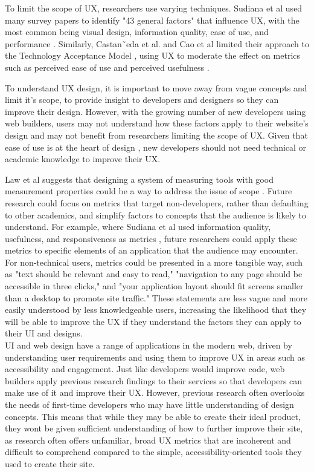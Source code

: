 \documentclass[article]{IEEEtran}
\begin{document}
            To limit the scope of UX, researchers use varying techniques. Sudiana et al used many survey papers to identify "43 general factors" that influence UX, with the most common being visual design, information quality, ease of use, and performance \cite{sudiana}. Similarly, Castan˜eda et al. and Cao et al limited their approach to the Technology Acceptance Model \cite{TAS}, using UX to moderate the effect on metrics such as perceived ease of use and perceived usefulness \cite{castan, cao}.
            
            To understand UX design, it is important to move away from vague concepts and limit it's scope, to provide insight to developers and designers so they can improve their design. However, with the growing number of new developers using web builders, users may not understand how these factors apply to their website's design and may not benefit from researchers limiting the scope of UX. Given that ease of use is at the heart of design \cite{sudiana}, new developers should not need technical or academic knowledge to improve their UX.
                        
            Law et al suggests that designing a system of measuring tools with good measurement properties could be a way to address the issue of scope \cite{schaik}. Future research could focus on metrics that target non-developers, rather than defaulting to other academics, and simplify factors to concepts that the audience is likely to understand. For example, where Sudiana et al used information quality, usefulness, and responsiveness as metrics \cite{sudiana}, future researchers could apply these metrics to specific elements of an application that the audience may encounter. For non-technical users, metrics could be presented in a more tangible way, such as "text should be relevant and easy to read," "navigation to any page should be accessible in three clicks," and "your application layout should fit screens smaller than a desktop to promote site traffic." These statements are less vague and more easily understood by less knowledgeable users, increasing the likelihood that they will be able to improve the UX if they understand the factors they can apply to their UI and designs. \\
        
        UI and web design have a range of applications in the modern web, driven by understanding user requirements and using them to improve UX in areas such as accessibility and engagement. Just like developers would improve code, web builders apply previous research findings to their services so that developers can make use of it and improve their UX. However, previous research often overlooks the needs of first-time developers who may have little understanding of design concepts. This means that while they may be able to create their ideal product, they wont be given sufficient understanding of how to further improve their site, as research often offers unfamiliar, broad UX metrics that are incoherent and difficult to comprehend compared to the simple, accessibility-oriented tools they used to create their site.
        
\end{document}
